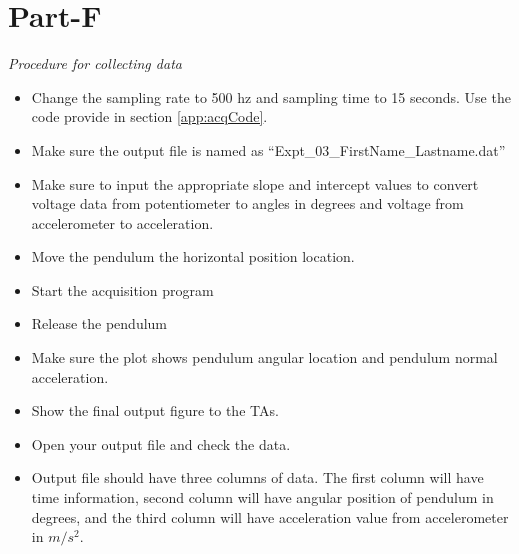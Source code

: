 \documentclass{article} %
\begin{document}
\section{Part-F}
\emph {Procedure for collecting data}
\begin{itemize}
\item Change the sampling rate to 500 hz and sampling time to 15 seconds. Use the code provide in section \ref{app:acqCode}.
\item Make sure the output file is named as ``Expt\_03\_FirstName\_Lastname.dat''
\item Make sure to input the appropriate slope and intercept values to convert voltage data from potentiometer to angles in degrees and voltage from accelerometer to acceleration.
\item Move the pendulum the horizontal position location.
\item Start the acquisition program 
\item Release the pendulum 
\item Make sure the plot shows pendulum angular location and pendulum normal acceleration.
\item Show the final output figure to the TAs.
\item Open your output file and check the data. 
\item Output file should have three columns of data. The first column will have time information, second column will have angular position of pendulum in degrees, and the third column will have acceleration value from accelerometer in $m/s^2$.
\end{itemize}
\end{document}
